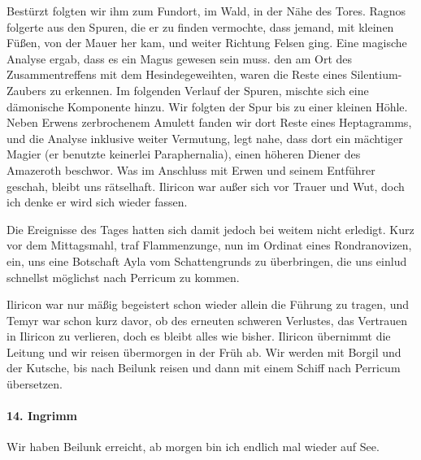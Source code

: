 Bestürzt folgten wir ihm zum Fundort, im Wald, in der Nähe des Tores. Ragnos folgerte aus den Spuren, die er zu finden vermochte, dass jemand, mit kleinen Füßen, von der Mauer her kam, und weiter Richtung Felsen ging. Eine magische Analyse ergab, dass es ein Magus gewesen sein muss. den am Ort des Zusammentreffens mit dem Hesindegeweihten, waren die Reste eines Silentium-Zaubers zu erkennen. Im folgenden Verlauf der Spuren, mischte sich eine dämonische Komponente hinzu. Wir folgten der Spur bis zu einer kleinen Höhle. Neben Erwens zerbrochenem Amulett fanden wir dort Reste eines Heptagramms, und die Analyse inklusive weiter Vermutung, legt nahe, dass dort ein mächtiger Magier (er benutzte keinerlei Paraphernalia), einen höheren Diener des Amazeroth beschwor. Was im Anschluss mit Erwen und seinem Entführer geschah, bleibt uns rätselhaft. Iliricon war außer sich vor Trauer und Wut, doch ich denke er wird sich wieder fassen.

Die Ereignisse des Tages hatten sich damit jedoch bei weitem nicht erledigt. Kurz vor dem Mittagsmahl, traf Flammenzunge, nun im Ordinat eines Rondranovizen, ein, uns eine Botschaft Ayla vom Schattengrunds zu überbringen, die uns einlud schnellst möglichst nach Perricum zu kommen.

Iliricon war nur mäßig begeistert schon wieder allein die Führung zu tragen, und Temyr war schon kurz davor, ob des erneuten schweren Verlustes, das Vertrauen in Iliricon zu verlieren, doch es bleibt alles wie bisher. Iliricon übernimmt die Leitung und wir reisen übermorgen in der Früh ab. Wir werden mit Borgil und der Kutsche, bis nach Beilunk reisen und dann mit einem Schiff nach Perricum übersetzen.

\paragraph{14. Ingrimm}
Wir haben Beilunk erreicht, ab morgen bin ich endlich mal wieder auf See.

